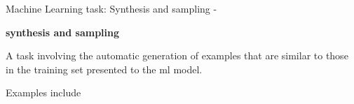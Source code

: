 

\begin{frame}[t,allowframebreaks]{
    Machine Learning task: Synthesis and sampling - }

    {\bf {}\Gls{synthesis and sampling}} \\
    \vspace{0.1cm}
    \begin{itemize}
        {
            \item
            A task involving the automatic generation of examples 
            that are similar to those in the 
            \gls{training set}
            presented to the \gls{ml} model.\\
            \vspace{0.1cm}
            \item
            Examples include \\
        }
    \end{itemize}

\end{frame}
